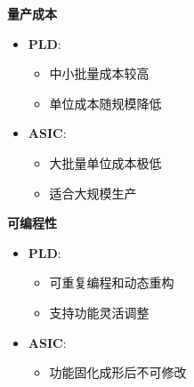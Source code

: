 \documentclass[
  ignorenonframetext,
  chinese,
]{beamer}
\providecommand{\tightlist}{%
  \setlength{\itemsep}{0pt}\setlength{\parskip}{0pt}}
\begin{document}
\begin{frame}
\textbf{量产成本}

\begin{itemize}
\tightlist
\item
  \textbf{PLD}:

  \begin{itemize}
  \tightlist
  \item
    中小批量成本较高\\
  \item
    单位成本随规模降低\\
  \end{itemize}
\item
  \textbf{ASIC}:

  \begin{itemize}
  \tightlist
  \item
    大批量单位成本极低\\
  \item
    适合大规模生产
  \end{itemize}
\end{itemize}
\end{frame}

\begin{frame}
\textbf{可编程性}

\begin{itemize}
\tightlist
\item
  \textbf{PLD}:

  \begin{itemize}
  \tightlist
  \item
    可重复编程和动态重构\\
  \item
    支持功能灵活调整\\
  \end{itemize}
\item
  \textbf{ASIC}:

  \begin{itemize}
  \tightlist
  \item
    功能固化成形后不可修改
  \end{itemize}
\end{itemize}
\end{frame}
\end{document}

